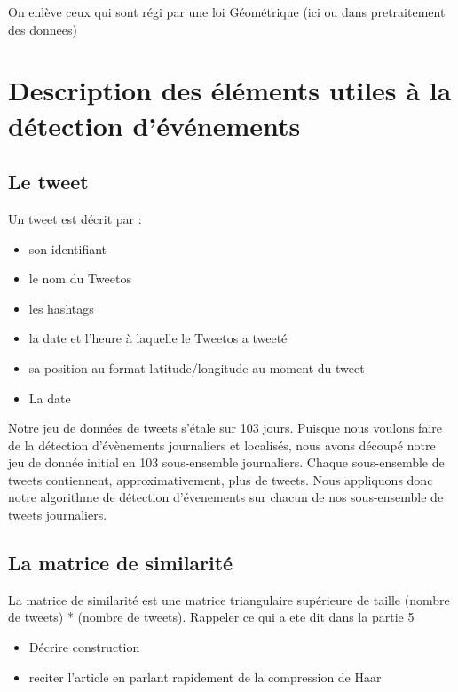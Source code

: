 \documentclass[12pt]{article}
\begin{document}
On enl\`eve ceux qui sont r\'egi par une loi G\'eom\'etrique (ici ou dans pretraitement des donnees)

\newpage

\section{Description des \'el\'ements utiles \`a la d\'etection d'\'ev\'enements}

\subsection{Le tweet}
Un tweet est d\'ecrit par : 

\begin{itemize}
\item son identifiant
\item le nom du Tweetos
\item les hashtags
\item la date et l'heure \`a laquelle le Tweetos a tweet\'e
\item sa position au format latitude/longitude au moment du tweet
\item La date
\end{itemize}

Notre jeu de donn\'ees de tweets s'\'etale sur 103 jours. Puisque nous voulons faire de la d\'etection d'\'ev\`enements journaliers et localis\'es, nous avons d\'ecoup\'e notre jeu de donn\'ee initial en 103 sous-ensemble journaliers. Chaque sous-ensemble de tweets contiennent, approximativement, plus de  tweets.
\newline
Nous appliquons donc notre algorithme de d\'etection d'\'evenements sur chacun de nos sous-ensemble de tweets journaliers.

\subsection{La matrice de similarit\'e}
La matrice de similarit\'e est une matrice triangulaire sup\'erieure de taille (nombre de
tweets) * (nombre de tweets).
\newline
Rappeler ce qui a ete dit dans la partie 5
\begin{itemize}
	\item D\'ecrire construction
	\item reciter l'article en parlant rapidement de la compression de Haar
\end{itemize}
\end{document}
